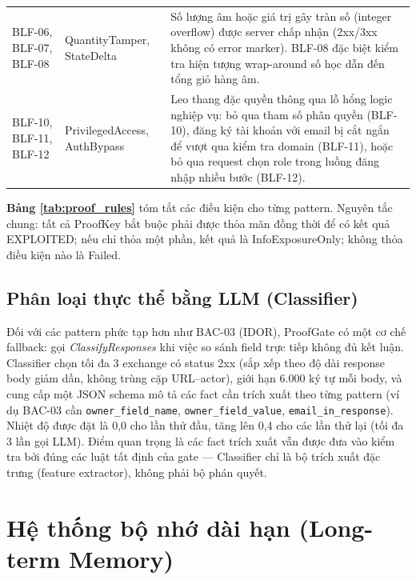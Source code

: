 \begin{longtable}{
  >{\raggedright\arraybackslash}p{2.8cm}
  >{\raggedright\arraybackslash}p{3.2cm}
  >{\raggedright\arraybackslash}p{8.8cm}
}
BLF-06, BLF-07, BLF-08 &
  QuantityTamper, StateDelta &
  Số lượng âm hoặc giá trị gây tràn số (integer overflow) được server chấp nhận (2xx/3xx không có error marker). BLF-08 đặc biệt kiểm tra hiện tượng wrap-around số học dẫn đến tổng giỏ hàng âm. \\[4pt]

BLF-10, BLF-11, BLF-12 &
  PrivilegedAccess, AuthBypass &
  Leo thang đặc quyền thông qua lỗ hổng logic nghiệp vụ: bỏ qua tham số phân quyền (BLF-10), đăng ký tài khoản với email bị cắt ngắn để vượt qua kiểm tra domain (BLF-11), hoặc bỏ qua request chọn role trong luồng đăng nhập nhiều bước (BLF-12). \\

\end{longtable}
\renewcommand{\arraystretch}{1}

\textbf{Bảng \ref{tab:proof_rules}} tóm tắt các điều kiện cho từng pattern. Nguyên tắc chung: tất cả ProofKey bắt buộc phải được thỏa mãn đồng thời để có kết quả EXPLOITED; nếu chỉ thỏa một phần, kết quả là InfoExposureOnly; không thỏa điều kiện nào là Failed.

\subsection{Phân loại thực thể bằng LLM (Classifier)}

Đối với các pattern phức tạp hơn như BAC-03 (IDOR), ProofGate có một cơ chế fallback: gọi \textit{ClassifyResponses} khi việc so sánh field trực tiếp không đủ kết luận. Classifier chọn tối đa 3 exchange có status 2xx (sắp xếp theo độ dài response body giảm dần, không trùng cặp URL--actor), giới hạn 6.000 ký tự mỗi body, và cung cấp một JSON schema mô tả các fact cần trích xuất theo từng pattern (ví dụ BAC-03 cần \texttt{owner\_field\_name}, \texttt{owner\_field\_value}, \texttt{email\_in\_response}). Nhiệt độ được đặt là 0,0 cho lần thử đầu, tăng lên 0,4 cho các lần thử lại (tối đa 3 lần gọi LLM). Điểm quan trọng là các fact trích xuất vẫn được đưa vào kiểm tra bởi đúng các luật tất định của gate --- Classifier chỉ là bộ trích xuất đặc trưng (feature extractor), không phải bộ phán quyết.

\section{Hệ thống bộ nhớ dài hạn (Long-term Memory)}


